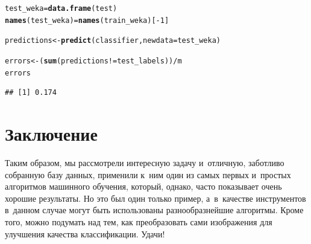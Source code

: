 \documentclass[final,pdftex]{../../template/epsilonj}\usepackage[]{graphicx}\usepackage[]{color}
\makeatletter
\newcommand{\hlnum}[1]{\textcolor[rgb]{0.686,0.059,0.569}{#1}}%
\newcommand{\hlopt}[1]{\textcolor[rgb]{0,0,0}{#1}}%
\newcommand{\hlstd}[1]{\textcolor[rgb]{0.345,0.345,0.345}{#1}}%
\newcommand{\hlkwb}[1]{\textcolor[rgb]{0.69,0.353,0.396}{#1}}%
\newcommand{\hlkwc}[1]{\textcolor[rgb]{0.333,0.667,0.333}{#1}}%
\newcommand{\hlkwd}[1]{\textcolor[rgb]{0.737,0.353,0.396}{\textbf{#1}}}%
\newenvironment{kframe}{%
 \def\at@end@of@kframe{}%
 \ifinner\ifhmode%
  \def\at@end@of@kframe{\end{minipage}}%
  \begin{minipage}{\columnwidth}%
 \fi\fi%
 \def\FrameCommand##1{\hskip\@totalleftmargin \hskip-\fboxsep
 \colorbox{shadecolor}{##1}\hskip-\fboxsep
     \hskip-\linewidth \hskip-\@totalleftmargin \hskip\columnwidth}%
 \MakeFramed {\advance\hsize-\width
   \@totalleftmargin\z@ \linewidth\hsize
   \@setminipage}}%
 {\par\unskip\endMakeFramed%
 \at@end@of@kframe}
\newenvironment{knitrout}{}{} %
\makeatother
\begin{document}
\begin{knitrout}
\color{fgcolor}\begin{kframe}
\begin{alltt}
\hlstd{test_weka} \hlkwb{=} \hlkwd{data.frame}\hlstd{(test)}
\hlkwd{names}\hlstd{(test_weka)} \hlkwb{=} \hlkwd{names}\hlstd{(train_weka)[}\hlopt{-}\hlnum{1}\hlstd{]}

\hlstd{predictions} \hlkwb{<-} \hlkwd{predict}\hlstd{(classifier,} \hlkwc{newdata} \hlstd{= test_weka)}

\hlstd{errors} \hlkwb{<-} \hlstd{(}\hlkwd{sum}\hlstd{(predictions} \hlopt{!=} \hlstd{test_labels))}\hlopt{/}\hlstd{m}
\hlstd{errors}
\end{alltt}
\begin{verbatim}
## [1] 0.174
\end{verbatim}
\end{kframe}
\end{knitrout}

\section{Заключение}

Таким образом, мы рассмотрели интересную задачу и~отличную, заботливо собранную базу данных, применили к~ним один из самых первых и~простых алгоритмов машинного обучения, который, однако, часто показывает очень хорошие результаты. 
Но это был один только пример, а~в~качестве инструментов в~данном случае могут быть использованы разнообразнейшие алгоритмы. 
Кроме того, можно подумать над тем, как преобразовать сами изображения для улучшения качества классификации. Удачи!


\printbibliography
\end{document}
